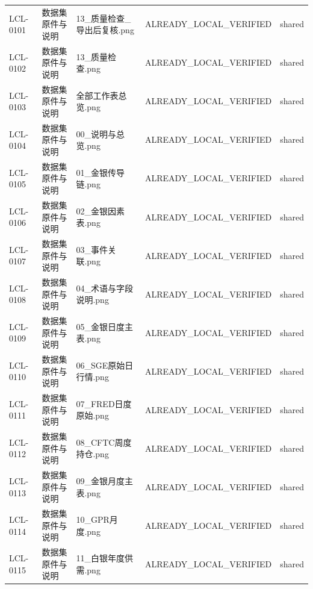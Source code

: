 \documentclass[UTF8,openany,oneside,11pt]{ctexbook}
\begin{document}
\begin{longtable}{L{1.4cm}L{2.4cm}L{6.0cm}L{3.0cm}L{1.8cm}}
LCL-\allowbreak{}0101 & 数据集原件与说明 & 13\_\allowbreak{}质量检查\_\allowbreak{}导出后复核.png & ALREADY\_\allowbreak{}LOCAL\_\allowbreak{}VERIFIED & shared \\
LCL-\allowbreak{}0102 & 数据集原件与说明 & 13\_\allowbreak{}质量检查.png & ALREADY\_\allowbreak{}LOCAL\_\allowbreak{}VERIFIED & shared \\
LCL-\allowbreak{}0103 & 数据集原件与说明 & 全部工作表总览.png & ALREADY\_\allowbreak{}LOCAL\_\allowbreak{}VERIFIED & shared \\
LCL-\allowbreak{}0104 & 数据集原件与说明 & 00\_\allowbreak{}说明与总览.png & ALREADY\_\allowbreak{}LOCAL\_\allowbreak{}VERIFIED & shared \\
LCL-\allowbreak{}0105 & 数据集原件与说明 & 01\_\allowbreak{}金银传导链.png & ALREADY\_\allowbreak{}LOCAL\_\allowbreak{}VERIFIED & shared \\
LCL-\allowbreak{}0106 & 数据集原件与说明 & 02\_\allowbreak{}金银因素表.png & ALREADY\_\allowbreak{}LOCAL\_\allowbreak{}VERIFIED & shared \\
LCL-\allowbreak{}0107 & 数据集原件与说明 & 03\_\allowbreak{}事件关联.png & ALREADY\_\allowbreak{}LOCAL\_\allowbreak{}VERIFIED & shared \\
LCL-\allowbreak{}0108 & 数据集原件与说明 & 04\_\allowbreak{}术语与字段说明.png & ALREADY\_\allowbreak{}LOCAL\_\allowbreak{}VERIFIED & shared \\
LCL-\allowbreak{}0109 & 数据集原件与说明 & 05\_\allowbreak{}金银日度主表.png & ALREADY\_\allowbreak{}LOCAL\_\allowbreak{}VERIFIED & shared \\
LCL-\allowbreak{}0110 & 数据集原件与说明 & 06\_\allowbreak{}SGE原始日行情.png & ALREADY\_\allowbreak{}LOCAL\_\allowbreak{}VERIFIED & shared \\
LCL-\allowbreak{}0111 & 数据集原件与说明 & 07\_\allowbreak{}FRED日度原始.png & ALREADY\_\allowbreak{}LOCAL\_\allowbreak{}VERIFIED & shared \\
LCL-\allowbreak{}0112 & 数据集原件与说明 & 08\_\allowbreak{}CFTC周度持仓.png & ALREADY\_\allowbreak{}LOCAL\_\allowbreak{}VERIFIED & shared \\
LCL-\allowbreak{}0113 & 数据集原件与说明 & 09\_\allowbreak{}金银月度主表.png & ALREADY\_\allowbreak{}LOCAL\_\allowbreak{}VERIFIED & shared \\
LCL-\allowbreak{}0114 & 数据集原件与说明 & 10\_\allowbreak{}GPR月度.png & ALREADY\_\allowbreak{}LOCAL\_\allowbreak{}VERIFIED & shared \\
LCL-\allowbreak{}0115 & 数据集原件与说明 & 11\_\allowbreak{}白银年度供需.png & ALREADY\_\allowbreak{}LOCAL\_\allowbreak{}VERIFIED & shared \\

\end{longtable}
\end{document}
